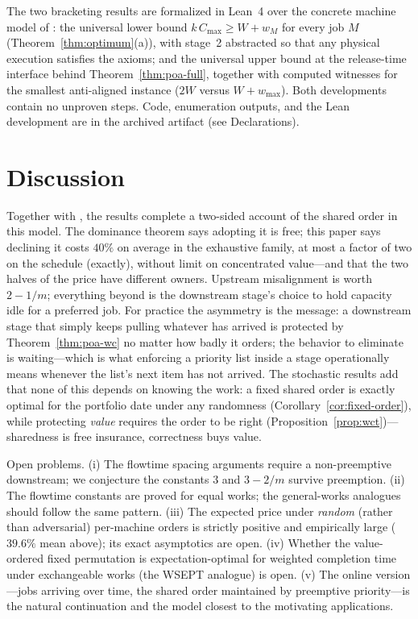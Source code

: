 \documentclass[sn-mathphys,NameDate]{sn-jnl}
\theoremstyle{thmstyleone}
\theoremstyle{thmstylethree}
\theoremstyle{thmstyletwo}
\begin{document}
The two bracketing results are formalized in Lean~4 over the
concrete machine model of \citet{bowmanA}: the universal lower
bound $k\,C_{\max} \ge W + w_M$ for every job $M$
(Theorem~\ref{thm:optimum}(a)), with stage~2 abstracted so that any
physical execution satisfies the axioms; and the universal upper
bound at the release-time interface behind
Theorem~\ref{thm:poa-full}, together with computed witnesses for
the smallest anti-aligned instance ($2W$ versus $W + w_{\max}$).
Both developments contain no unproven steps. Code, enumeration
outputs, and the Lean development are in the archived artifact (see
Declarations).

\section{Discussion}
\label{sec:discussion}

Together with \citet{bowmanA,bowmanB}, the results complete a
two-sided account of the shared order in this model. The dominance
theorem says adopting it is free; this paper says declining it
costs $40\%$ on average in the exhaustive family, at most a factor
of two on the schedule (exactly), without limit on concentrated
value---and that the two halves of the price have different owners.
Upstream misalignment is worth $2 - 1/m$; everything beyond is the
downstream stage's choice to hold capacity idle for a preferred
job. For practice the asymmetry is the message: a downstream stage
that simply keeps pulling whatever has arrived is protected by
Theorem~\ref{thm:poa-wc} no matter how badly it orders; the
behavior to eliminate is waiting---which is what enforcing a
priority list inside a stage operationally means whenever the
list's next item has not arrived. The stochastic results add that
none of this depends on knowing the work: a fixed shared order is
exactly optimal for the portfolio date under any randomness
(Corollary~\ref{cor:fixed-order}), while protecting \emph{value}
requires the order to be right
(Proposition~\ref{prop:wct})---sharedness is free insurance,
correctness buys value.

Open problems. (i) The flowtime spacing arguments require a
non-preemptive downstream; we conjecture the constants $3$ and
$3 - 2/m$ survive preemption. (ii) The flowtime constants are
proved for equal works; the general-works analogues should follow
the same pattern. (iii) The expected price under \emph{random}
(rather than adversarial) per-machine orders is strictly positive
and empirically large ($39.6\%$ mean above); its exact asymptotics
are open. (iv) Whether the value-ordered fixed permutation is
expectation-optimal for weighted completion time under exchangeable
works (the WSEPT analogue) is open. (v) The online version---jobs
arriving over time, the shared order maintained by preemptive
priority---is the natural continuation and the model closest to the
motivating applications.
\end{document}
